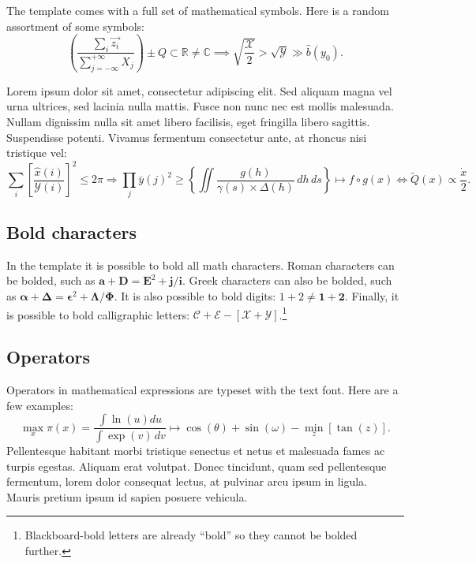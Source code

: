 \documentclass[letterpaper,11pt,leqno]{article}
\begin{document}
The template comes with a full set of mathematical symbols. Here is a random assortment of some symbols: 
\begin{equation*}
\left(\frac{\sum_i \vec{z_i}}{\sum_{j=-\infty}^{+\infty} X_j}\right) \pm Q \subset \mathbb{R} \neq \mathbb{C} \implies \sqrt{\frac{\mathcal{X}}{2}} > \sqrt{\mathcal{Y}} \gg \hat{b}(y_0).
\end{equation*}

Lorem ipsum dolor sit amet, consectetur adipiscing elit. Sed aliquam magna vel urna ultrices, sed lacinia nulla mattis. Fusce non nunc nec est mollis malesuada. Nullam dignissim nulla sit amet libero facilisis, eget fringilla libero sagittis. Suspendisse potenti. Vivamus fermentum consectetur ante, at rhoncus nisi tristique vel:
\begin{equation*}
\sum_i \left[\frac{\hat{x}(i)}{\mathcal{Y}(i)}\right]^2 \leq 2\pi \Rightarrow \prod_j \bar{y}(j)^2 \geq \left\{\iint \frac{g(h)}{\gamma(s) \times \Delta(h)}\,dh\,ds \right\} \mapsto f\circ g(x) \iff \tilde{Q}(x) \propto \frac{\dot{x}}{2}.
\end{equation*}

\subsection{Bold characters}

In the template it is possible to bold all math characters. Roman characters can be bolded, such as $\bm{a} + \bm{D} = \bm{E}^2 + \bm{j}/\bm{i}$. Greek characters can also be bolded, such as $\bm{\alpha} + \bm{\Delta} = \bm{\epsilon}^2 + \bm{\Lambda}/\bm{\Phi}$. It is also possible to bold digits: $1 + 2 \neq \bm{1} + \bm{2}$. Finally, it is possible to bold calligraphic letters: $\bm{\mathcal{C}} + \bm{\mathcal{E}} - [\bm{\mathcal{X}}+\bm{\mathcal{Y}}]$.\footnote{Blackboard-bold letters are already ``bold'' so they cannot be bolded further.}

\subsection{Operators} 

Operators in mathematical expressions are typeset with the text font. Here are a few examples: 
\begin{equation*}
\max_x \pi(x) = \frac{\int \ln(u)du}{\int\exp(v)\,dv} \mapsto \cos(\theta) + \sin(\omega) - \min_z[\tan(z)].
\end{equation*}
Pellentesque habitant morbi tristique senectus et netus et malesuada fames ac turpis egestas. Aliquam erat volutpat. Donec tincidunt, quam sed pellentesque fermentum, lorem dolor consequat lectus, at pulvinar arcu ipsum in ligula. Mauris pretium ipsum id sapien posuere vehicula. 
\end{document}
